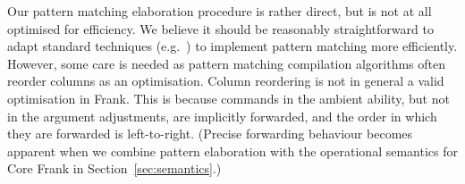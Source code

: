 \documentclass[11pt]{article}
\begin{document}
Our pattern matching elaboration procedure is rather direct, but is
not at all optimised for efficiency. We believe it should be
reasonably straightforward to adapt standard techniques
(e.g.~\cite{Maranget08}) to implement pattern matching more
efficiently.
%
However, some care is needed as pattern matching compilation
algorithms often reorder columns as an optimisation. Column reordering
is not in general a valid optimisation in Frank. This is because
commands in the ambient ability, but not in the argument adjustments,
are implicitly forwarded, and the order in which they are forwarded is
left-to-right.
%
(Precise forwarding behaviour becomes apparent when we
combine pattern elaboration with the operational semantics for Core
Frank in Section~\ref{sec:semantics}.)

\end{document}
